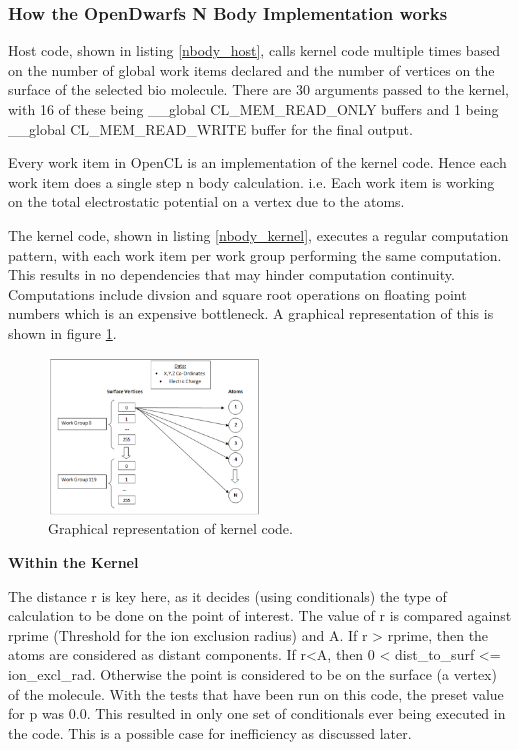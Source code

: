 \subsubsection{How the OpenDwarfs N Body Implementation works}
\par{Host code, {\color{red}shown in listing \ref{nbody_host}}, calls kernel code multiple 
    times based on the number of global work items declared and 
    the number of vertices on the surface of the selected bio molecule. There are 30 arguments passed 
    to the kernel, with 16 of these being \_\_global CL\_MEM\_READ\_ONLY buffers and 1 being \_\_global CL\_MEM\_READ\_WRITE 
    buffer for the final output.}

\par{Every work item in OpenCL is an implementation of the kernel code. 
    Hence each work item does a single step n body calculation. i.e. 
    Each work item is working on the total electrostatic potential on a vertex due to the atoms.}

\par{The kernel code, {\color{red}shown in listing \ref{nbody_kernel}}, 
    executes a regular computation pattern, with each work item per work group 
    performing the same computation. This results in no dependencies that may hinder computation continuity. 
    Computations include divsion and square root operations on floating point numbers which is an expensive bottleneck. 
    {\color{red}A graphical representation of this is shown in figure \ref{nbody_graph}.}}

\begin{figure}[!h]
    \centering
    \includegraphics[width=0.5\textwidth]{figures/graph_nbody.png}
    \caption{Graphical representation of kernel code.}
    \label{nbody_graph}
\end{figure}

\par{\textbf{Within the Kernel}}
\par{The distance r is key here, as it decides (using conditionals) the type of calculation 
    to be done on the point of interest. The value of r is compared against rprime (Threshold 
    for the ion exclusion radius) and A. If r > rprime, then the atoms are considered as distant 
    components. If r<A, then 0 < dist\_to\_surf <= ion\_excl\_rad. Otherwise the point is considered 
    to be on the surface (a vertex) of the molecule. With the tests that have been run on this code, 
    the preset value for p was 0.0. This resulted in only one set of conditionals ever being executed 
    in the code. This is a possible case for inefficiency as discussed later.}

